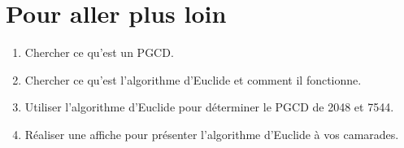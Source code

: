 \documentclass[12pt,a4paper,french]{/home/nyaucki/Documents/Prof/CoursMaths/mycls/Exercices}
\begin{document}

\maketitle









\section{Pour aller plus loin}
\begin{enumerate}
	\item Chercher ce qu'est un PGCD.
	\item Chercher ce qu'est l'algorithme d'Euclide et comment il fonctionne.
	\item Utiliser l'algorithme d'Euclide pour déterminer le PGCD de 2048 et 7544.
	\item Réaliser une affiche pour présenter l'algorithme d'Euclide à vos camarades.
\end{enumerate}
\end{document}
